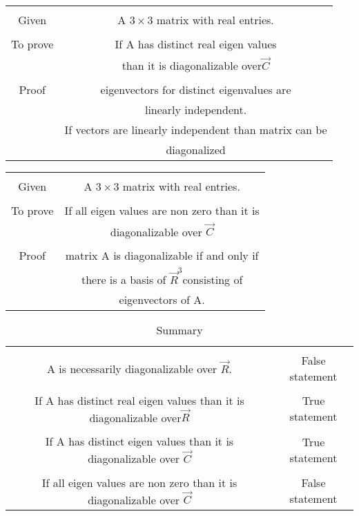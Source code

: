 \documentclass[journal,12pt,twocolumn]{IEEEtran}
\begin{document}
\clearpage
\renewcommand{\thetable}{3}
\begin{table*}[ht]
\begin{center}
\begin{tabular}{|c|c|}
\hline
& \\
Given & A $3\times 3$ matrix  with real entries.\\
\hline
& \\
To prove & If A has distinct real  eigen values\\
& than  it is diagonalizable over$\vec{C}$\\
\hline
& \\
Proof &  eigenvectors for distinct eigenvalues are \\
& linearly independent. \\
& If vectors are linearly independent than matrix can be\\ & diagonalized\\
\hline
\end{tabular}
\end{center}
\label{table:3}
\end{table*}
\renewcommand{\thetable}{4}
\begin{table*}[ht]
\begin{center}
\begin{tabular}{|c|c|}
\hline
& \\
Given & A $3\times 3$ matrix  with real entries.\\
\hline
& \\
To prove & If all eigen values are non zero than it is\\ & diagonalizable over $\vec{C}$\\
\hline
& \\
Proof &  matrix A is diagonalizable if and only if\\ &there is a basis of $\vec{R}^3 $consisting of\\
& eigenvectors of A. \\
\hline
\end{tabular}
\label{table:4}
\end{center}
\end{table*}
\renewcommand{\thetable}{5}
\begin{table*}[ht]
\begin{center}
\begin{tabular}{|c|c|}
\hline
& \\
A  is necessarily diagonalizable over $\vec{R}$.
& False statement\\
\hline
& \\
If A has distinct real  eigen values than
it is diagonalizable over$\vec{R}$
& True statement\\
\hline
& \\
If A has distinct eigen values than
it is diagonalizable over $\vec{C}$
&  True statement\\
\hline
& \\
If all eigen values are non zero than it is diagonalizable over $\vec{C}$
& False statement\\
\hline
\end{tabular}
\caption{Summary}
\label{table:5}
\end{center}
\end{table*}
\end{document}
